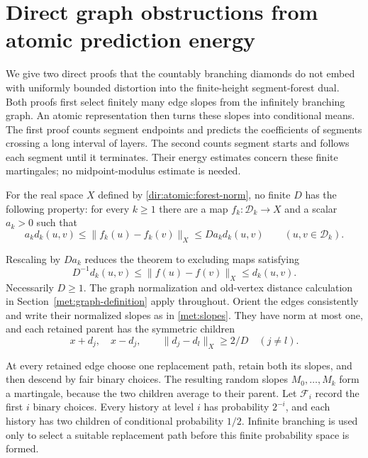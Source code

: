 \section{Direct graph obstructions from atomic prediction energy}
\label{dir:atomic:section}

We give two direct proofs that the countably branching diamonds do not embed
with uniformly bounded distortion into the finite-height segment-forest dual.
Both proofs first select finitely many edge slopes from the infinitely
branching graph.  An atomic representation then turns these slopes into
conditional means.  The first proof counts segment endpoints and predicts the
coefficients of segments crossing a long interval of layers.  The second
counts segment starts and follows each segment until it terminates.  Their
energy estimates concern these finite martingales; no midpoint-modulus
estimate is needed.

\begin{theorem}\label{dir:atomic:obstruction}
For the real space $X$ defined by \eqref{dir:atomic:forest-norm}, no finite
$D$ has the following property: for every $k\ge1$ there are a map
$f_k:\mathcal D_k\to X$ and a scalar $a_k>0$ such that
\[
 a_k d_k(u,v)\le\|f_k(u)-f_k(v)\|_X\le D a_k d_k(u,v)
 \qquad(u,v\in\mathcal D_k).
\]
\end{theorem}

Rescaling by $D a_k$ reduces the theorem to excluding maps satisfying
\begin{equation}\label{dir:atomic:normalization}
 D^{-1}d_k(u,v)\le\|f(u)-f(v)\|_X\le d_k(u,v).
\end{equation}
Necessarily $D\ge1$. The graph normalization and old-vertex distance
calculation in Section~\ref{met:graph-definition} apply throughout.
Orient the edges consistently and write their normalized slopes as in
\eqref{met:slopes}. They have norm at most one, and each retained parent
has the symmetric children
\begin{equation}\label{dir:atomic:splittings}
 x+d_j,\quad x-d_j,\qquad
 \|d_j-d_l\|_X\ge 2/D\quad(j\ne l).
\end{equation}

At every retained edge choose one replacement path, retain both its
slopes, and then descend by fair binary choices.  The resulting random
slopes $M_0,\ldots,M_k$ form a martingale, because the two children average
to their parent.  Let $\mathcal F_i$ record the first $i$ binary choices.
Every history at level $i$ has probability $2^{-i}$, and each history has
two children of conditional probability $1/2$.  Infinite branching is
used only to select a suitable replacement path before this finite
probability space is formed.

